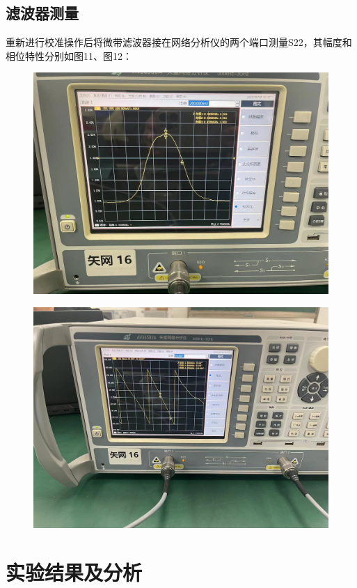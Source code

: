 \documentclass{source/Report}
\begin{document}
\subsection{滤波器测量}
重新进行校准操作后将微带滤波器接在网络分析仪的两个端口测量S22，其幅度和相位特性分别如图11、图12：
\begin{figure}[H]
    \begin{center}
        \includegraphics[width=0.35\linewidth]{pic/cb1_p11.jpg}
        \caption{}
    \end{center}
\end{figure}
\begin{figure}[H]
    \begin{center}
        \includegraphics[width=0.35\linewidth]{pic/cb1_p12.jpg}
        \caption{}
    \end{center}
\end{figure}
\section{实验结果及分析}
\end{document}
